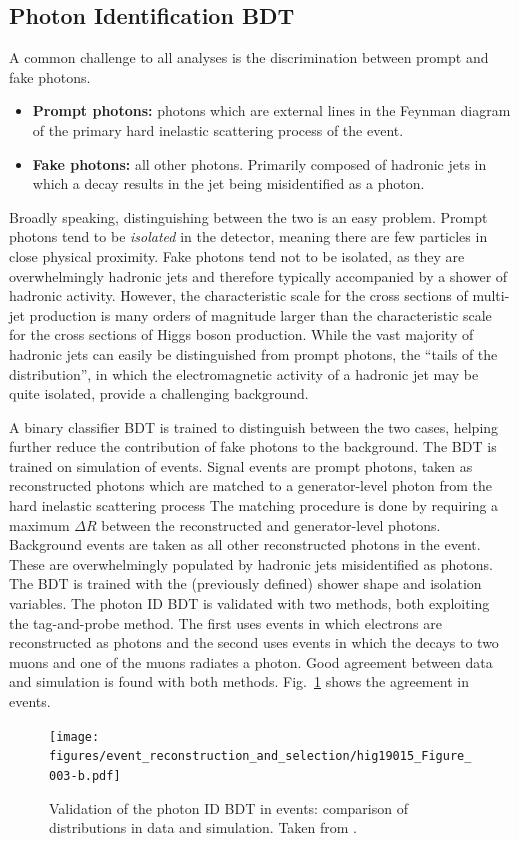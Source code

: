 \subsection{Photon Identification BDT} \label{sec:evt_photon_idmva}
A common challenge to all \Hgg analyses is the discrimination between prompt and fake photons.
\begin{itemize}
    \item \textbf{Prompt photons:} photons which are external lines in the Feynman diagram of the primary hard inelastic scattering process of the event.
    \item \textbf{Fake photons:} all other photons. Primarily composed of hadronic jets in which a \Pigg decay results in the jet being misidentified as a photon.
\end{itemize}
Broadly speaking, distinguishing between the two is an easy problem.
Prompt photons tend to be \emph{isolated} in the detector, meaning there are few particles in close physical proximity.
Fake photons tend not to be isolated, as they are overwhelmingly hadronic jets and therefore typically accompanied by a shower of hadronic activity.
However, the characteristic scale for the cross sections of multi-jet production is many orders of magnitude larger than the characteristic scale for the cross sections of Higgs boson production.
While the vast majority of hadronic jets can easily be distinguished from prompt photons, the ``tails of the distribution'', in which the electromagnetic activity of a hadronic jet may be quite isolated, provide a challenging background.

A binary classifier BDT is trained to distinguish between the two cases, helping further reduce the contribution of fake photons to the background.
The BDT is trained on simulation of \gjets events.
Signal events are prompt photons, taken as reconstructed photons which are matched to a generator-level photon from the hard inelastic scattering process
The matching procedure is done by requiring a maximum $\Delta R$ between the reconstructed and generator-level photons.
Background events are taken as all other reconstructed photons in the event.
These are overwhelmingly populated by hadronic jets misidentified as photons.
The BDT is trained with the (previously defined) shower shape and isolation variables.
The photon ID BDT is validated with two methods, both exploiting the tag-and-probe method.
The first uses \Zee events in which electrons are reconstructed as photons and the second uses \Zuug events in which the \PZ decays to two muons and one of the muons radiates a photon.
Good agreement between data and simulation is found with both methods. Fig.~\ref{fig:photon_idmva} shows the agreement in \Zee events.
\begin{figure} [h!]
    \centering
    \texttt{[image: figures/event\_reconstruction\_and\_selection/hig19015\_Figure\_003-b.pdf]}
    \caption{Validation of the photon ID BDT in \Zee events: comparison of distributions in data and simulation. Taken from \cite{CMS:2020omd}.}
    \label{fig:photon_idmva}
\end{figure}

